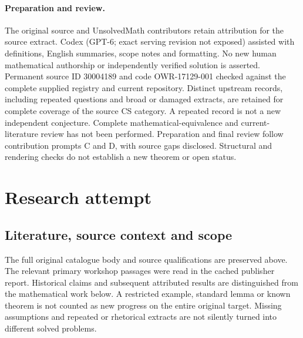 \documentclass[11pt]{article}
\begin{document}
\paragraph{Preparation and review.}
The original source and UnsolvedMath contributors retain attribution for the source extract. Codex (GPT-6; exact serving revision not exposed) assisted with definitions, English summaries, scope notes and formatting. No new human mathematical authorship or independently verified solution is asserted. Permanent source ID 30004189 and code OWR-17129-001 checked against the complete supplied registry and current repository. Distinct upstream records, including repeated questions and broad or damaged extracts, are retained for complete coverage of the source CS category. A repeated record is not a new independent conjecture. Complete mathematical-equivalence and current-literature review has not been performed. Preparation and final review follow contribution prompts C and D, with source gaps disclosed. Structural and rendering checks do not establish a new theorem or open status.
\label{end:30004189}

\section{Research attempt}
\subsection{Literature, source context and scope}
The full original catalogue body and source qualifications are preserved above. The relevant primary workshop passages were read in the cached publisher report. Historical claims and subsequent attributed results are distinguished from the mathematical work below. A restricted example, standard lemma or known theorem is not counted as new progress on the entire original target. Missing assumptions and repeated or rhetorical extracts are not silently turned into different solved problems.
\end{document}

